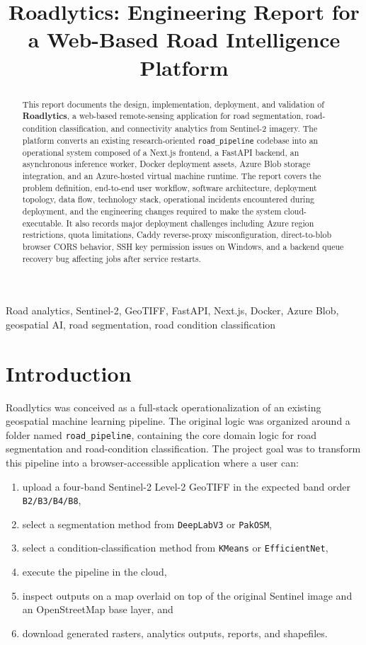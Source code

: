 \documentclass[conference]{IEEEtran}
\title{Roadlytics: Engineering Report for a Web-Based Road Intelligence Platform}
\author{
\IEEEauthorblockN{Prepared for the Roadlytics Project}
\IEEEauthorblockA{
Repository: Hammadullah2/Roadlytics \\
Deployment branch used during cloud rollout: \texttt{version2} \\
Report revision reference: commit \texttt{039d705}
}
}
\begin{document}
\maketitle

\begin{abstract}
This report documents the design, implementation, deployment, and validation of
\textbf{Roadlytics}, a web-based remote-sensing application for road
segmentation, road-condition classification, and connectivity analytics from
Sentinel-2 imagery. The platform converts an existing research-oriented
\texttt{road\_pipeline} codebase into an operational system composed of a
Next.js frontend, a FastAPI backend, an asynchronous inference worker, Docker
deployment assets, Azure Blob storage integration, and an Azure-hosted virtual
machine runtime. The report covers the problem definition, end-to-end user
workflow, software architecture, deployment topology, data flow, technology
stack, operational incidents encountered during deployment, and the engineering
changes required to make the system cloud-executable. It also records major
deployment challenges including Azure region restrictions, quota limitations,
Caddy reverse-proxy misconfiguration, direct-to-blob browser CORS behavior, SSH
key permission issues on Windows, and a backend queue recovery bug affecting
jobs after service restarts.
\end{abstract}

\begin{IEEEkeywords}
Road analytics, Sentinel-2, GeoTIFF, FastAPI, Next.js, Docker, Azure Blob,
geospatial AI, road segmentation, road condition classification
\end{IEEEkeywords}

\section{Introduction}
Roadlytics was conceived as a full-stack operationalization of an existing
geospatial machine learning pipeline. The original logic was organized around a
folder named \texttt{road\_pipeline}, containing the core domain logic for road
segmentation and road-condition classification. The project goal was to
transform this pipeline into a browser-accessible application where a user can:

\begin{enumerate}[leftmargin=16pt]
\item upload a four-band Sentinel-2 Level-2 GeoTIFF in the expected band order
\texttt{B2/B3/B4/B8},
\item select a segmentation method from \texttt{DeepLabV3} or \texttt{PakOSM},
\item select a condition-classification method from \texttt{KMeans} or
\texttt{EfficientNet},
\item execute the pipeline in the cloud,
\item inspect outputs on a map overlaid on top of the original Sentinel image
and an OpenStreetMap base layer, and
\item download generated rasters, analytics outputs, reports, and shapefiles.
\end{enumerate}
\end{document}
